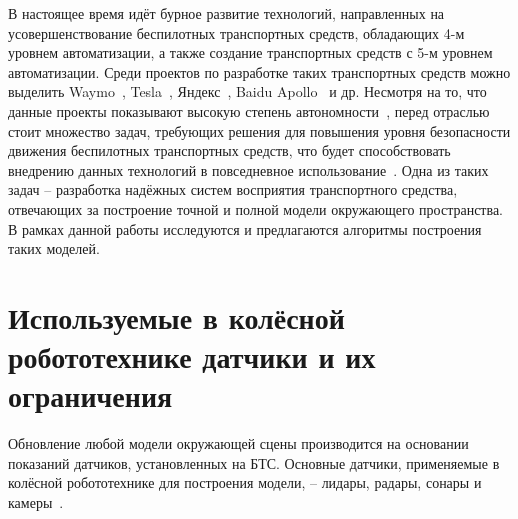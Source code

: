 В настоящее время идёт бурное развитие технологий, направленных на усовершенствование беспилотных транспортных средств, обладающих 4-м уровнем автоматизации, а также создание транспортных средств с 5-м уровнем автоматизации. Среди проектов по разработке таких транспортных средств можно выделить Waymo~\cite{schwall2020waymo}, Tesla~\cite{ingle2016tesla}, Яндекс~\cite{Хабр2021}, Baidu Apollo~\cite{fan2018baidu} и др. Несмотря на то, что данные проекты показывают высокую степень автономности~\cite{freedman2018autonomous}, перед отраслью стоит множество задач, требующих решения для повышения уровня безопасности движения беспилотных транспортных средств, что будет способствовать внедрению данных технологий в повседневное использование~\cite{khan2022level}. Одна из таких задач -- разработка надёжных систем восприятия транспортного средства, отвечающих за построение точной и полной модели окружающего пространства. В рамках данной работы исследуются и предлагаются алгоритмы построения таких моделей.

\section{Используемые в колёсной робототехнике датчики и их ограничения}\label{sec:ch1/sensors}

Обновление любой модели окружающей сцены производится на основании показаний датчиков, установленных на БТС. Основные датчики, применяемые в колёсной робототехнике для построения модели, -- лидары, радары, сонары и камеры~\cite{vargas2021overview}.

